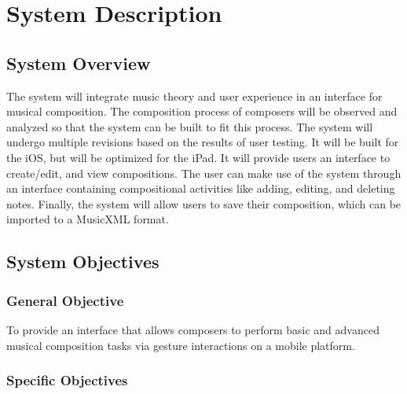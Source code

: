 \section{System Description}

\subsection{System Overview}

The system will integrate music theory and user experience in an interface for musical composition. The composition process of composers will be observed and analyzed so that the system can be built to fit this process. The system will undergo multiple revisions based on the results of user testing. It will be built for the iOS, but will be optimized for the iPad. It will provide users an interface to create/edit, and view compositions. The user can make use of the system through an interface containing compositional activities like adding, editing, and deleting notes. Finally, the system will allow users to save their composition, which can be imported to a MusicXML format.

\subsection{System Objectives}

	\subsubsection{General Objective}
		
        To provide an interface that allows composers to perform basic and advanced musical composition tasks via gesture interactions on a mobile platform.

	\subsubsection{Specific Objectives}
    
